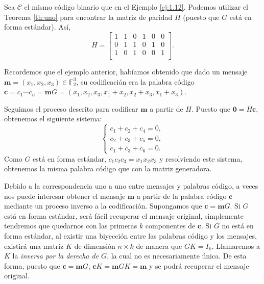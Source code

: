\begin{ejemplo}
  Sea $\mathcal{C}$ el mismo código binario que en el Ejemplo \ref{ej:1.12}. Podemos utilizar el Teorema \ref{th:uno} para encontrar la matriz de paridad $H$ (puesto que $G$ está en forma estándar). Así, 
  $$ H = \left[\begin{array}{cccccc}
    1&1&0&1&0&0\\
    0&1&1&0&1&0\\
    1&0&1&0&0&1\\
    \end{array}\right].
    $$
  
  Recordemos que el ejemplo anterior, habíamos obtenido que dado un mensaje $\mathbf{m} = (x_1,x_2,x_3) \in \mathds{F}_{2}^3$, su codificación era la palabra código $\mathbf{c} = c_1\cdots c_n = \mathbf{m}G = (x_1,x_2,x_3,x_1 + x_2,x_2 + x_3,x_1 + x_3)$.

  Seguimos el proceso descrito para codificar $\mathbf{m}$ a partir de $H$. Puesto que $\mathbf{0} = H\mathbf{c}$, obtenemos el siguiente sistema:
   \begin{equation*}
      \begin{cases}
        c_1 + c_2 + c_4 = 0,\\
        c_2 + c_3 + c_5 = 0,\\
        c_1 + c_3 + c_6 = 0.
      \end{cases}
    \end{equation*}
  Como $G$ está en forma estándar, $c_1 c_2 c_3 = x_1 x_2 x_3$ y resolviendo este sistema, obtenemos la misma palabra código que con la matriz generadora.

  
\end{ejemplo}

Debido a la correspondencia uno a uno entre mensajes y palabras código, a veces nos puede interesar obtener el mensaje $\textbf{m}$ a partir de la palabra código $\textbf{c}$ mediante un proceso inverso a la codificación. Supongamos que $\mathbf{c} = \mathbf{m}G$. Si $G$ está en forma estándar, será fácil recuperar el mensaje original, simplemente tendremos que quedarnos con las primeras $k$ componentes de $\mathbf{c}$. Si $G$ no está en forma estándar, al existir una biyección entre las palabras código y los mensajes, existirá una matriz $K$ de dimensión $n \times k$ de manera que $GK = I_k$. Llamaremos a $K$ la \emph{inversa por la derecha de $G$}, la cual no es necesariamente única. De esta forma, puesto que $\mathbf{c} = \mathbf{m}G$, $\mathbf{c}K = \mathbf{m}GK = \mathbf{m}$ y se podrá recuperar el mensaje original.

